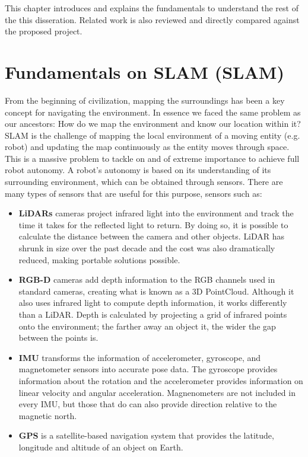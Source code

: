This chapter introduces and explains the fundamentals to understand the rest of the this disseration. Related work is also reviewed and directly compared against the proposed project.

\section{Fundamentals on \acl*{SLAM} (\acs*{SLAM})}

From the beginning of civilization, mapping the surroundings has been a key concept for navigating the environment. In essence we faced the same problem as our ancestors: How do we map the environment and know our location within it? \acs*{SLAM} is the challenge of mapping the local environment of a moving entity (e.g. robot) and updating the map continuously as the entity moves through space. This is a massive problem to tackle on and of extreme importance to achieve full robot autonomy. A robot's autonomy is based on its understanding of its surrounding environment, which can be obtained through sensors. There are many types of sensors that are useful for this purpose, sensors such as:
\begin{itemize}
    \item \textbf{\acs*{LiDAR}s} cameras project infrared light into the environment and track the time it takes for the reflected light to return. By doing so, it is possible to calculate the distance between the camera and other objects. \acs*{LiDAR} has shrunk in size over the past decade and the cost was also dramatically reduced, making portable solutions possible.
    \item \textbf{RGB-D} cameras add depth information to the RGB channels used in standard cameras, creating what is known as a 3D PointCloud. Although it also uses infrared light to compute depth information, it works differently than a \acs*{LiDAR}. Depth is calculated by projecting a grid of infrared points onto the environment; the farther away an object it, the wider the gap between the points is.
    \item \textbf{\acs*{IMU}} transforms the information of accelerometer, gyroscope, and magnetometer sensors into accurate pose data. The gyroscope provides information about the rotation and the accelerometer provides information on linear velocity and angular acceleration. Magnenometers are not included in every \acs*{IMU}, but those that do can also provide direction relative to the magnetic north.
    \item \textbf{\acs*{GPS}} is a satellite-based navigation system that provides the latitude, longitude and altitude of an object on Earth.
\end{itemize}


